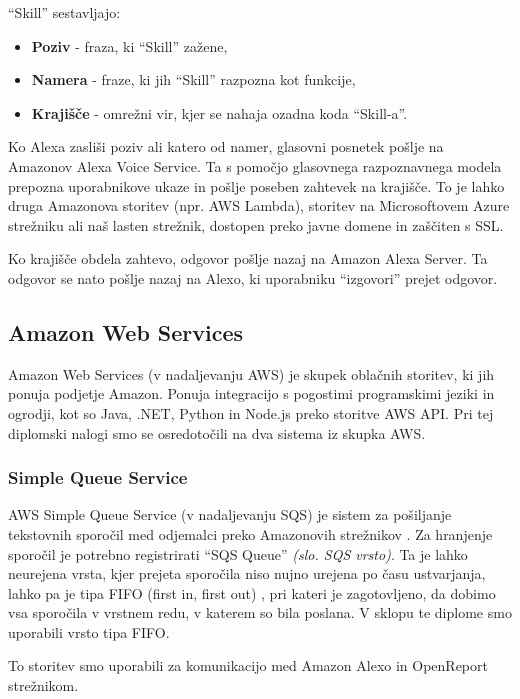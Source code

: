 \documentclass[a4paper, 12pt]{book}
\begin{document}
\noindent \enquote{Skill} sestavljajo:
\begin{itemize}
	\item \textbf{Poziv} - fraza, ki \enquote{Skill} zažene,
	\item \textbf{Namera} - fraze, ki jih \enquote{Skill} razpozna kot funkcije,
	\item \textbf{Krajišče} - omrežni vir, kjer se nahaja ozadna koda \enquote{Skill-a}.
\end{itemize}



Ko Alexa zasliši poziv ali katero od namer, glasovni posnetek pošlje na Amazonov Alexa Voice Service.
Ta s pomočjo glasovnega razpoznavnega modela prepozna uporabnikove ukaze in pošlje poseben zahtevek na krajišče.
To je lahko druga Amazonova storitev (npr. AWS Lambda), storitev na Microsoftovem Azure strežniku ali naš lasten strežnik, dostopen preko javne domene in zaščiten s SSL.

Ko krajišče obdela zahtevo, odgovor pošlje nazaj na Amazon Alexa Server.
Ta odgovor se nato pošlje nazaj na Alexo, ki uporabniku \enquote{izgovori} prejet odgovor.

\subsection{Amazon Web Services}

Amazon Web Services (v nadaljevanju AWS) je skupek oblačnih storitev, ki jih ponuja podjetje Amazon.
Ponuja integracijo s pogostimi programskimi jeziki in ogrodji, kot so Java, .NET, Python in Node.js preko storitve AWS API.
Pri tej diplomski nalogi smo se osredotočili na dva sistema iz skupka AWS.

\subsubsection{Simple Queue Service}

AWS Simple Queue Service (v nadaljevanju SQS) je sistem za pošiljanje tekstovnih sporočil med odjemalci preko Amazonovih strežnikov \cite{sqs}.
Za hranjenje sporočil je potrebno registrirati \enquote{SQS Queue} \textit{(slo. SQS vrsto)}. 
Ta je lahko neurejena vrsta, kjer prejeta sporočila niso nujno urejena po času ustvarjanja, lahko pa je tipa FIFO (first in, first out) \cite{sqsfifo}, pri kateri je zagotovljeno, da dobimo vsa sporočila v vrstnem redu, v katerem so bila poslana.
V sklopu te diplome smo uporabili vrsto tipa FIFO.

To storitev smo uporabili za komunikacijo med Amazon Alexo in OpenReport strežnikom.
\end{document}
